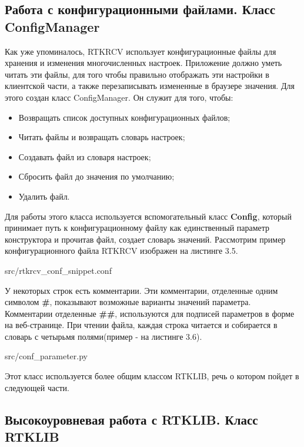 \subsection{Работа с конфигурационными файлами. Класс ConfigManager} \label{subsect3_1_2}

Как уже упоминалось, RTKRCV использует конфигурационные файлы для хранения и изменения многочисленных настроек. Приложение должно уметь читать эти файлы, для того чтобы правильно отображать эти настройки в клиентской части, а также перезаписывать измененные в браузере значения. Для этого создан класс ConfigManager. Он служит для того, чтобы:

\begin{itemize}
  \item Возвращать список доступных конфигурационных файлов;
  \item Читать файлы и возвращать словарь настроек;
  \item Создавать файл из словаря настроек;
  \item Сбросить файл до значения по умолчанию;
  \item Удалить файл.
\end{itemize}

Для работы этого класса используется вспомогательный класс \textbf{Config}, который принимает путь к конфигурационному файлу как единственный параметр конструктора и прочитав файл, создает словарь значений. Рассмотрим пример конфигурационного файла RTKRCV изображен на листинге 3.5.


{src/rtkrcv_conf_snippet.conf}

У некоторых строк есть комментарии. Эти комментарии, отделенные одним символом \textbf{\#}, показывают возможные варианты значений параметра. Комментарии отделенные \textbf{\#\#}, используются для подписей параметров в форме на веб-странице. При чтении файла, каждая строка читается и собирается в словарь с четырьмя полями(пример - на листинге 3.6).


{src/conf_parameter.py}

Этот класс используется более общим классом RTKLIB, речь о котором пойдет в следующей части.

\subsection{Высокоуровневая работа с RTKLIB. Класс RTKLIB} \label{subsect3_1_4}

